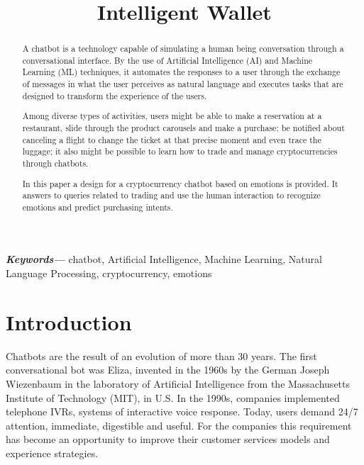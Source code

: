 \documentclass[	DIV=calc,%
							paper=letter,%
							fontsize=12pt%
                            ]{scrartcl}	 					%
\title{Intelligent Wallet}					%
\author{}											%
\date{}																				%
\newcommand{\initial}[1]{%
     \lettrine[lines=3,lhang=0.3,nindent=0em]{
     				\color{DarkGoldenrod}
     				{\textsf{#1}}}{}}
\providecommand{\keywords}[1]
{
  \small	
  \textbf{\textit{Keywords---}} #1
}
\begin{document}
\maketitle


\newpage
\begin{abstract}
	
{A chatbot is a technology capable of simulating a human being conversation through a conversational interface. By the use of Artificial Intelligence (AI) and Machine Learning (ML) techniques, it automates the responses to a user through the exchange of messages in what the user perceives as natural language and executes tasks that are designed to transform the experience of the users.

Among diverse types of activities, users might be able to make a reservation   at a restaurant, slide through the product carousels and make a purchase; be notified about canceling a flight to change the ticket at that precise moment and even trace the luggage; it also might be possible to learn how to trade and manage cryptocurrencies through chatbots.

In this paper a design for a cryptocurrency chatbot based on emotions is provided. It answers to queries related to trading and use the human interaction to recognize emotions and predict purchasing intents.}

\end{abstract}

\keywords{chatbot, Artificial Intelligence, Machine Learning, Natural Language Processing, cryptocurrency, emotions}

\newpage
\tableofcontents
\newpage
\listoffigures
\newpage

\thispagestyle{fancy} 			%

\section{\label{sec:level1}Introduction}

Chatbots are the result of an evolution of more than 30 years. The first conversational bot was Eliza, invented in the 1960s by the German Joseph Wiezenbaum in the laboratory of Artificial Intelligence from the Massachusetts Institute of Technology (MIT), in U.S. In the 1990s, companies implemented telephone IVRs, systems of interactive voice response. Today, users demand 24/7 attention, immediate, digestible and useful. For the companies this requirement has become an opportunity to improve their customer services models and experience strategies. 
\end{document}
